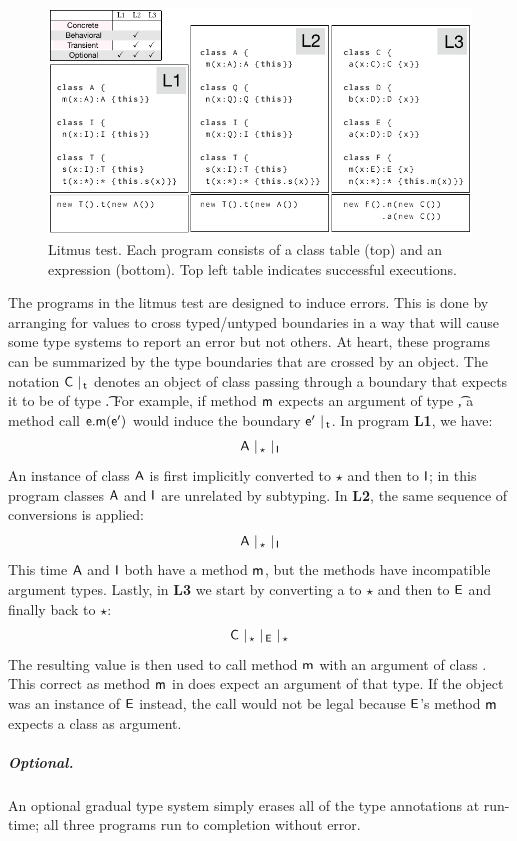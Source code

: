 \documentclass[a4paper,USenglish]{lipics-v2018}
\newcommand{\EM}[1]{\ensuremath{#1}\xspace}
\newcommand{\xt}[1]{{\sf{#1}}}
\newcommand{\EMxt}[1]{\EM{\xt{#1}}}
\newcommand{\m}{\EMxt m}
\newcommand{\A}{\EMxt {A}}
\newcommand{\I}{\EMxt {I}}
\newcommand{\E}{\EMxt {E}}
\newcommand{\any}{\EM{\star}}
\begin{document}
\begin{figure}[h] 
\includegraphics[width=.95\columnwidth]{litm}
\caption{Litmus test. Each program consists of a class table (top) and
an expression (bottom). Top left table indicates successful
executions.}\label{litmus}
\end{figure}

The programs in the litmus test are designed to induce errors. This is done by arranging for
values to cross typed/untyped boundaries in a way that will cause some type
systems to report an error but not others. At heart, these programs can 
be summarized by the
type boundaries that are crossed by an object. The
notation $\C ~\vert_{\,\t}$ denotes an object of class \C passing
through a boundary that expects it to be of type \t. For example,
if method \m expects an argument of type \t, a method call $\e.\m(\ep)$ would
induce the boundary $\ep ~\vert_{\,\t}$. 
In program {\bf L1}, we have:
\[\A ~\vert_{\,\any} ~ \vert_{\,\I}\] 
An instance of 
class \A is first implicitly converted to \any and then to \I; in this program
classes \A and \I are unrelated by subtyping. In {\bf L2}, the same sequence
of conversions is applied:
\[\A~ \vert_{\,\any} ~ \vert_{\,\I}\] 
This time \A and \I both have a
method \m, but the methods have incompatible argument types. Lastly, in
{\bf L3} we start by converting a \C to \any and then to \E
and finally back to \any:
\[\C~ \vert_{\,\any}~\vert_{\,\E}~\vert_{\,\any}\]
The resulting value is then used to call method \m with an argument of class \C.
This correct as method \m in \C does expect an
argument of that type. If the object was an instance of \E instead, the call
would not be legal because \E's method \m expects a class \D as argument.

\subparagraph*{Optional.} An optional gradual type system simply erases all of the
type annotations at run-time; all three programs run to completion without
error.
\end{document}
